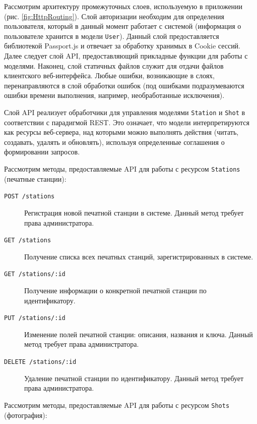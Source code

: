 \documentclass[a4paper,14pt,href,draft]{article}
\begin{document}
Рассмотрим архитектуру промежуточных слоев, используемую в приложении (рис. \ref{fig:HttpRouting}). Слой авторизации
необходим для определения пользователя, который в данный момент работает с системой (информация о пользователе хранится
в модели \texttt{User}). Данный слой предоставляется библиотекой Passport.js и отвечает за обработку хранимых в
Cookie сессий. Далее следует слой API, предоставляющий прикладные функции для работы с моделями. Наконец, слой статичных
файлов служит для отдачи файлов клиентского веб-интерфейса. Любые ошибки, возникающие в слоях, перенаправляются в слой
обработки ошибок (под ошибками подразумеваются ошибки времени выполнения, например, необработанные исключения).

Слой API реализует обработчики для управления моделями \texttt{Station} и \texttt{Shot} в соответствии с парадигмой
REST. Это означает, что модели интерпретируются как ресурсы веб-сервера, над которыми можно выполнять действия (читать,
создавать, удалять и обновлять), используя определенные соглашения о формировании запросов.

Рассмотрим методы, предоставляемые API для работы с ресурсом \texttt{Stations} (печатные станции):

\begin{description}
  \item[\texttt{POST /stations}] Регистрация новой печатной станции в системе. Данный метод требует права администратора.
  \item[\texttt{GET /stations}] Получение списка всех печатных станций, зарегистрированных в системе.
  \item[\texttt{GET /stations/:id}] Получение информации о конкретной печатной станции по идентификатору.
  \item[\texttt{PUT /stations/:id}] Изменение полей печатной станции: описания, названия и ключа. Данный метод требует
    права администратора.
  \item[\texttt{DELETE /stations/:id}] Удаление печатной станции по идентификатору. Данный метод требует права
    администратора.
\end{description}

Рассмотрим методы, предоставляемые API для работы с ресурсом \texttt{Shots} (фотография):
\end{document}
